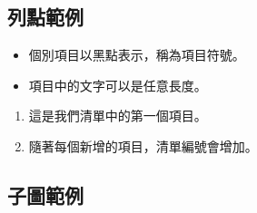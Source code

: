 \subsection{列點範例}

\begin{itemize}
    \item 個別項目以黑點表示，稱為項目符號。
    \item 項目中的文字可以是任意長度。
\end{itemize}

\begin{enumerate}
    \item 這是我們清單中的第一個項目。
    \item 隨著每個新增的項目，清單編號會增加。
\end{enumerate}

\clearpage
\subsection{子圖範例}

